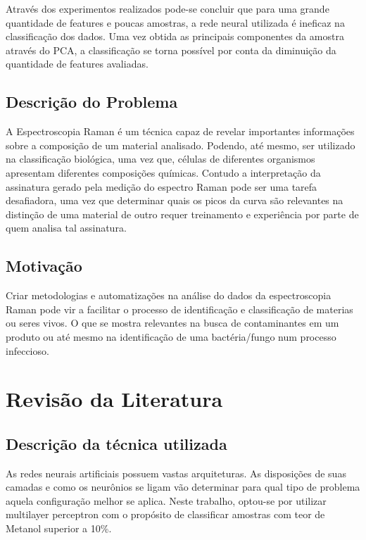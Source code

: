 \documentclass{article}
\begin{document}
Através dos experimentos realizados pode-se concluir que para uma grande quantidade de features e poucas amostras, a rede neural utilizada é ineficaz na classificação dos dados. Uma vez obtida as principais componentes da amostra através do PCA, a classificação se torna possível por conta da diminuição da quantidade de features avaliadas.

\vspace{2cm}
\subsection{Descrição do Problema}
\vspace{1cm} A Espectroscopia Raman é um técnica capaz de revelar importantes informações sobre a composição de um material analisado. Podendo, até mesmo, ser utilizado na classificação biológica, uma vez que, células de diferentes organismos apresentam diferentes composições químicas.
Contudo a interpretação da assinatura gerado pela medição do espectro Raman pode ser uma tarefa desafiadora, uma vez que determinar quais os picos da curva são relevantes na distinção de uma material de outro requer treinamento e experiência por parte de quem analisa tal assinatura.

\subsection{Motivação}
\vspace{1cm} Criar metodologias e automatizações na análise do dados da espectroscopia Raman pode vir a facilitar o processo de identificação e classificação de materias ou seres vivos. O que se mostra relevantes na busca de contaminantes em um produto ou até mesmo na identificação de uma bactéria/fungo num processo infeccioso.

\vspace{2cm}
\section{Revisão da Literatura}
\subsection{Descrição da técnica utilizada}
As redes neurais artificiais possuem vastas arquiteturas. As disposições de suas camadas e como os neurônios se ligam vão determinar para qual tipo de problema aquela configuração melhor se aplica. Neste trabalho, optou-se por utilizar multilayer perceptron com o propósito de classificar amostras com teor de Metanol superior a 10\%.\vspace{4cm}
\end{document}
